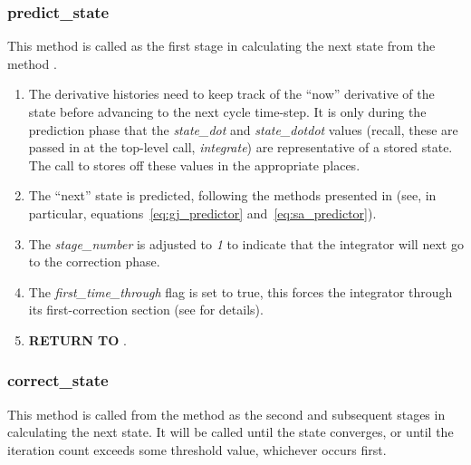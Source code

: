 \subsubsection{predict\_state}\label{ref:GJ_predict_state}

This method is called as the first stage in calculating the next state
from the method .

\begin{enumerate}

\item The derivative histories need to keep track of the ``now''
derivative of the state before
advancing to the next cycle time-step. It is only during the
prediction phase that the \textit{state\_dot} and
\textit{state\_dotdot} values (recall, these are passed in at the
top-level call, \textit{integrate}) are representative of a stored
state. The call to 
stores off these values in the appropriate places.

\item The ``next'' state is
predicted, following the methods presented in 
 (see, in particular, equations~\ref{eq:gj_predictor} 
and~\ref{eq:sa_predictor}).

\item The \textit{stage\_number} is adjusted to \textit{1} to indicate that the
integrator will next go to the correction phase.

\item The \textit{first\_time\_through} flag is set to true, this forces
the integrator through its first-correction section (see
 for details).
\item {\bfseries RETURN TO} .
\end{enumerate}

\subsubsection{correct\_state}\label{ref:GJ_correct_state}

This method is called from the method 
as the second
and subsequent stages in calculating the next state. It will
be called until the state converges, or until the iteration count
exceeds some threshold value, whichever occurs first.

